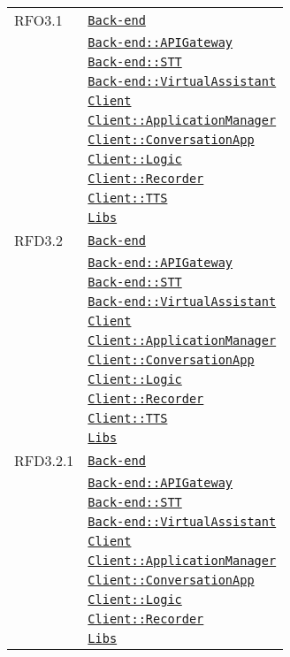 \begin{longtable}{|>{\centering}m{3cm}|m{10cm}<{\centering}|}
RFO3.1 & \hyperref[Back-end]{\texttt{Back-end}}\\
& \hyperref[Back-end::APIGateway]{\texttt{Back-end::APIGateway}}\\
& \hyperref[Back-end::STT]{\texttt{Back-end::STT}}\\
& \hyperref[Back-end::VirtualAssistant]{\texttt{Back-end::VirtualAssistant}}\\
& \hyperref[Client]{\texttt{Client}}\\
& \hyperref[Client::ApplicationManager]{\texttt{Client::ApplicationManager}}\\
& \hyperref[Client::ConversationApp]{\texttt{Client::ConversationApp}}\\
& \hyperref[Client::Logic]{\texttt{Client::Logic}}\\
& \hyperref[Client::Recorder]{\texttt{Client::Recorder}}\\
& \hyperref[Client::TTS]{\texttt{Client::TTS}}\\
& \hyperref[Libs]{\texttt{Libs}}\\ \hline

RFD3.2 & \hyperref[Back-end]{\texttt{Back-end}}\\
& \hyperref[Back-end::APIGateway]{\texttt{Back-end::APIGateway}}\\
& \hyperref[Back-end::STT]{\texttt{Back-end::STT}}\\
& \hyperref[Back-end::VirtualAssistant]{\texttt{Back-end::VirtualAssistant}}\\
& \hyperref[Client]{\texttt{Client}}\\
& \hyperref[Client::ApplicationManager]{\texttt{Client::ApplicationManager}}\\
& \hyperref[Client::ConversationApp]{\texttt{Client::ConversationApp}}\\
& \hyperref[Client::Logic]{\texttt{Client::Logic}}\\
& \hyperref[Client::Recorder]{\texttt{Client::Recorder}}\\
& \hyperref[Client::TTS]{\texttt{Client::TTS}}\\
& \hyperref[Libs]{\texttt{Libs}}\\ \hline

RFD3.2.1 & \hyperref[Back-end]{\texttt{Back-end}}\\
& \hyperref[Back-end::APIGateway]{\texttt{Back-end::APIGateway}}\\
& \hyperref[Back-end::STT]{\texttt{Back-end::STT}}\\
& \hyperref[Back-end::VirtualAssistant]{\texttt{Back-end::VirtualAssistant}}\\
& \hyperref[Client]{\texttt{Client}}\\
& \hyperref[Client::ApplicationManager]{\texttt{Client::ApplicationManager}}\\
& \hyperref[Client::ConversationApp]{\texttt{Client::ConversationApp}}\\
& \hyperref[Client::Logic]{\texttt{Client::Logic}}\\
& \hyperref[Client::Recorder]{\texttt{Client::Recorder}}\\
& \hyperref[Libs]{\texttt{Libs}}\\ \hline


\end{longtable}
